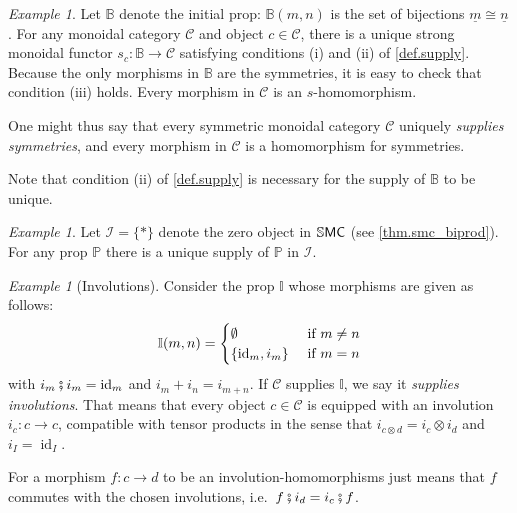 \documentclass[11pt, oneside, article]{memoir}
\theoremstyle{plain}
\theoremstyle{definition}
\theoremstyle{remark}
\newtheorem{example}[theorem]{Example}
\newcommand{\ord}[1]{\underline{#1}}%
\newcommand{\cat}[1]{\mathcal{#1}}%
\newcommand{\ccat}[1]{\mathbb{#1}}%
\newcommand{\Cat}[1]{{\mathsf{#1}}}%
\newcommand{\CCat}[1]{\mathbb{\StrLeft{#1}{1}}\Cat{\StrGobbleLeft{#1}{1}}}%
\DeclareMathOperator{\id}{id}
\newcommand{\tn}[1]{\textnormal{#1}}
\newcommand{\bij}{\bb}
\newcommand{\ssmc}{\CCat{SMC}}
\renewcommand{\aa}{\mathbb{A}} %
\newcommand{\bb}{\mathbb{B}} %
\newcommand{\pp}{\mathbb{P}}
\newcommand{\zero}{\cat{I}}
\newcommand{\cp}{\mathbin{\fatsemi}}
\begin{document}
\begin{example}\label{ex.supply_ids}
Let $\bij$ denote the initial prop: $\bij(m,n)$ is the set of bijections $\ord{m}\cong\ord{n}$. For any monoidal category $\cat{C}$ and object $c\in\cat{C}$, there is a unique strong monoidal functor $s_c\colon\bij\to\cat{C}$ satisfying conditions (i) and (ii) of \cref{def.supply}. Because the only morphisms in $\bij$ are the symmetries, it is easy to check that condition (iii) holds. Every morphism in $\cat{C}$ is an $s$-homomorphism. 

One might thus say that every symmetric monoidal category $\cat{C}$ uniquely \emph{supplies symmetries}, and every morphism in $\cat{C}$ is a homomorphism for symmetries.

Note that condition (ii) of \cref{def.supply} is necessary for the supply of $\bij$ to be unique.
\end{example}

\begin{example}\label{ex.terminal_supply}
Let $\zero=\{*\}$ denote the zero object in $\ssmc$ (see \cref{thm.smc_biprod}). For any prop $\pp$ there is a unique supply of $\pp$ in $\zero$.
\end{example}

\begin{example}[Involutions]\label{ex.supply_involutions}
Consider the prop $\ccat{I}$ whose morphisms are given as follows:
\[
  \ccat{I}(m,n)=
  \begin{cases}
  	\emptyset&\tn{ if }m\neq n\\
		\{\id_m, i_m\}&\tn{ if }m=n
  \end{cases}
 \]
 with $i_m\cp i_m=\id_m$ and $i_m+i_n=i_{m+n}$. If $\cat{C}$ supplies $\ccat{I}$, we say it \emph{supplies involutions}. That means that every object $c\in\cat{C}$ is equipped with an involution $i_c\colon c\to c$, compatible with tensor products in the sense that $i_{c\otimes d}=i_c\otimes i_d$ and $i_I=\id_I$.
 
For a morphism $f\colon c\to d$ to be an involution-homomorphisms just means that $f$ commutes with the chosen involutions, i.e.\ $f\cp i_d=i_c\cp f$.
\end{example}
\end{document}
